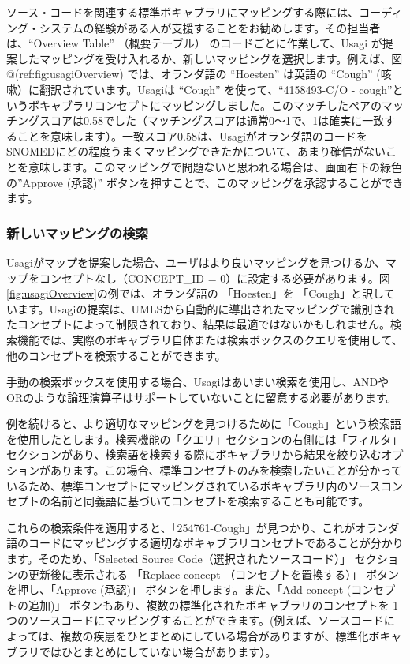 \documentclass[
  11pt]{book}
\theoremstyle{definition}
\theoremstyle{definition}
\theoremstyle{definition}
\theoremstyle{definition}
\theoremstyle{remark}
\begin{document}
ソース・コードを関連する標準ボキャブラリにマッピングする際には、コーディング・システムの経験がある人が支援することをお勧めします。その担当者は、``Overview Table'' （概要テーブル） のコードごとに作業して、Usagi が提案したマッピングを受け入れるか、新しいマッピングを選択します。例えば、図 @(ref:fig:usagiOverview) では、オランダ語の ``Hoesten'' は英語の ``Cough'' (咳嗽）に翻訳されています。Usagiは ``Cough'' を使って、``4158493-C/O - cough''というボキャブラリコンセプトにマッピングしました。このマッチしたペアのマッチングスコアは0.58でした（マッチングスコアは通常0～1で、1は確実に一致することを意味します）。一致スコア0.58は、Usagiがオランダ語のコードをSNOMEDにどの程度うまくマッピングできたかについて、あまり確信がないことを意味します。このマッピングで問題ないと思われる場合は、画面右下の緑色の''Approve (承認)'' ボタンを押すことで、このマッピングを承認することができます。

\subsubsection*{新しいマッピングの検索}\label{ux65b0ux3057ux3044ux30deux30c3ux30d4ux30f3ux30b0ux306eux691cux7d22}

Usagiがマップを提案した場合、ユーザはより良いマッピングを見つけるか、マップをコンセプトなし（CONCEPT\_ID = 0）に設定する必要があります。図 \ref{fig:usagiOverview}の例では、オランダ語の 「Hoesten」を 「Cough」と訳しています。Usagiの提案は、UMLSから自動的に導出されたマッピングで識別されたコンセプトによって制限されており、結果は最適ではないかもしれません。検索機能では、実際のボキャブラリ自体または検索ボックスのクエリを使用して、他のコンセプトを検索することができます。

手動の検索ボックスを使用する場合、Usagiはあいまい検索を使用し、ANDやORのような論理演算子はサポートしていないことに留意する必要があります。

例を続けると、より適切なマッピングを見つけるために「Cough」という検索語を使用したとします。検索機能の「クエリ」セクションの右側には「フィルタ」セクションがあり、検索語を検索する際にボキャブラリから結果を絞り込むオプションがあります。この場合、標準コンセプトのみを検索したいことが分かっているため、標準コンセプトにマッピングされているボキャブラリ内のソースコンセプトの名前と同義語に基づいてコンセプトを検索することも可能です。

これらの検索条件を適用すると、「254761-Cough」が見つかり、これがオランダ語のコードにマッピングする適切なボキャブラリコンセプトであることが分かります。そのため、「Selected Source Code（選択されたソースコード）」 セクションの更新後に表示される 「Replace concept （コンセプトを置換する）」 ボタンを押し、「Approve (承認)」 ボタンを押します。また、「Add concept (コンセプトの追加)」 ボタンもあり、複数の標準化されたボキャブラリのコンセプトを 1 つのソースコードにマッピングすることができます。(例えば、ソースコードによっては、複数の疾患をひとまとめにしている場合がありますが、標準化ボキャブラリではひとまとめにしていない場合があります）。
\end{document}
